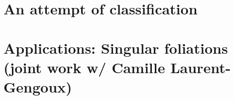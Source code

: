 \documentclass[hyperref={pdfpagelabels=false}]{beamer}
\theoremstyle{plain}
\theoremstyle{remark}
\begin{document}
\section[Classification]{An attempt of classification}





{
\section[Foliations]{Applications: Singular foliations \\(joint work w/ Camille Laurent-Gengoux)}
}
\end{document}
